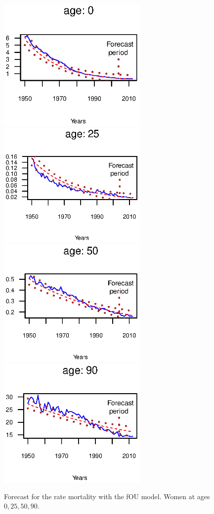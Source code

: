 \documentclass[smallextended]{svjour3}
\begin{document}
\begin{figure}[H]
    \caption{Forecast for the rate mortality with the fOU model. Women at ages
    $0,25,50,90$.}
    \includegraphics[width = 2.85in]{PlotWomenForecast0.eps}
    \includegraphics[width = 2.85in]{PlotWomenForecast25.eps}
    \includegraphics[width = 2.85in]{PlotWomenForecast50.eps}
    \includegraphics[width = 2.85in]{PlotWomenForecast90.eps}

\end{figure}
\end{document}
